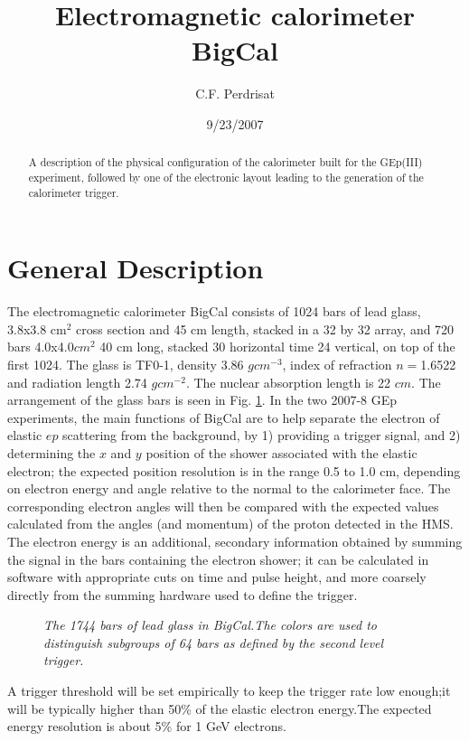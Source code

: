 \documentclass{chowto}
\title{Electromagnetic calorimeter BigCal}
\author{C.F. Perdrisat}
\date{9/23/2007}
\begin{document}
\begin{abstract}
A description of the physical configuration of the calorimeter built for 
the GEp(III) experiment, followed by one of the electronic layout leading 
to the generation of the calorimeter trigger.
\end{abstract}
\section{General Description}

The electromagnetic calorimeter BigCal consists of 1024 bars of lead glass, 
3.8x3.8 cm$^2$ cross section and 45 cm length, stacked in a 32 by 32 array, 
and 720 bars 4.0x4.0$cm^2$ 40 cm long, stacked 30 horizontal time 24 
vertical, on top of the first 1024. The glass is TF0-1, density 
3.86 $gcm^{-3}$, index of refraction $n=$1.6522 and radiation length 2.74 
$gcm^{-2}$. The nuclear absorption length is 22 $cm$. 
The arrangement of the glass bars is seen in Fig. \ref{fig:glassback}.
In the two 2007-8 GEp experiments, the main functions of BigCal are to 
help separate the electron of elastic $ep$ scattering from the background, 
by 1) providing a trigger signal, and 2) determining the $x$ and $y$ 
position of the shower associated with the elastic electron; the expected 
position resolution is 
in the range 0.5 to 1.0 cm, depending on electron energy and angle 
relative to the normal to the calorimeter face. The corresponding electron 
angles will then be compared with the expected values calculated from the
angles (and momentum) of the proton detected in the HMS. The electron energy 
is an additional, secondary information obtained by summing the signal in 
the bars 
containing the electron shower; it can be calculated in software with 
appropriate cuts on time and pulse height, and more
coarsely directly from the summing hardware used to 
define the trigger. 
\begin{figure}[h]
\begin{center}
\caption[]{\it{The 1744 bars of lead glass in BigCal.The colors are used to 
distinguish subgroups of 64 bars as defined by the second level trigger.}}
\label{fig:glassback}
\end{center}
\end{figure}
A trigger threshold will be set empirically to  
keep the trigger rate low enough;it will be typically higher than 50\% 
of the elastic electron energy.The expected energy resolution is about 5\% 
for 1 GeV electrons.
\end{document}
